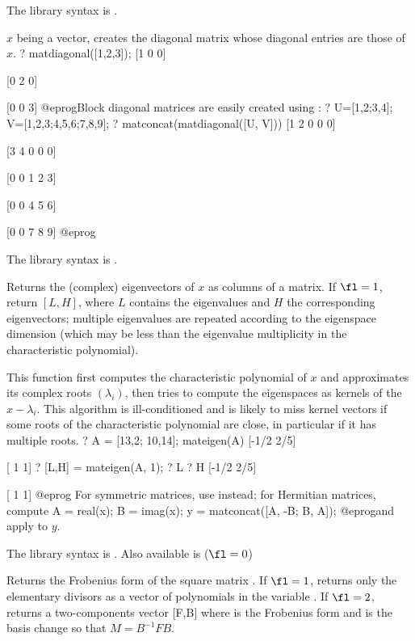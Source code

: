The library syntax is .

\label{se:matdiagonal}
$x$ being a vector, creates the diagonal matrix
whose diagonal entries are those of $x$.
\bprog
? matdiagonal([1,2,3]);
[1 0 0]

[0 2 0]

[0 0 3]
@eprog\noindent Block diagonal matrices are easily created using
:
\bprog
? U=[1,2;3,4]; V=[1,2,3;4,5,6;7,8,9];
? matconcat(matdiagonal([U, V]))
[1 2 0 0 0]

[3 4 0 0 0]

[0 0 1 2 3]

[0 0 4 5 6]

[0 0 7 8 9]
@eprog

The library syntax is .

\label{se:mateigen}
Returns the (complex) eigenvectors of $x$ as columns of a matrix.
If $\fl=1$, return $[L,H]$, where $L$ contains the
eigenvalues and $H$ the corresponding eigenvectors; multiple eigenvalues are
repeated according to the eigenspace dimension (which may be less
than the eigenvalue multiplicity in the characteristic polynomial).

This function first computes the characteristic polynomial of $x$ and
approximates its complex roots $(\lambda_i)$, then tries to compute the
eigenspaces as kernels of the $x - \lambda_i$. This algorithm is
ill-conditioned and is likely to miss kernel vectors if some roots of the
characteristic polynomial are close, in particular if it has multiple roots.
\bprog
? A = [13,2; 10,14]; mateigen(A)
[-1/2 2/5]

[   1   1]
? [L,H] = mateigen(A, 1);
? L
? H
[-1/2 2/5]

[   1   1]
@eprog\noindent
For symmetric matrices, use  instead; for Hermitian matrices,
compute
\bprog
 A = real(x);
 B = imag(x);
 y = matconcat([A, -B; B, A]);
@eprog\noindent and apply  to $y$.

The library syntax is .
Also available is  ($\fl = 0$)

\label{se:matfrobenius}
Returns the Frobenius form of
the square matrix . If $\fl=1$, returns only the elementary divisors as
a vector of polynomials in the variable .  If $\fl=2$, returns a
two-components vector [F,B] where  is the Frobenius form and  is
the basis change so that $M=B^{-1}FB$.

